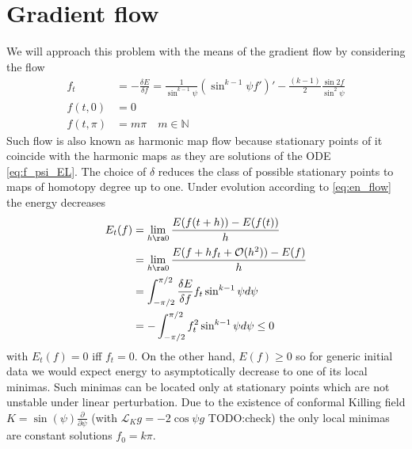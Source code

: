 \section{Gradient flow}
\label{sec:gradient-flow}


We will approach this problem with the means of the gradient
flow by considering the flow
\begin{equation}
  \label{eq:en_flow}
  \begin{split}
    f_t&=-\frac{\delta E}{\delta f}=\frac{1}{\sin^{k-1}\psi}\left(\sin^{k-1}\psi
      f'\right)'-\frac{(k-1)}{2}\frac{\sin2f}{\sin^2\psi}\\
    f\left(t,0\right)&=0\\
    f\left(t,\pi\right)&=m\pi\quad m\in\mathbb{N}
  \end{split}
\end{equation}
Such flow is also known as harmonic map flow because stationary points
of it coincide with the harmonic maps as they are solutions of the ODE
\eqref{eq:f_psi_EL}. The choice of $\delta$ reduces the class of
possible stationary points to maps of homotopy degree up to one. Under
evolution according to \eqref{eq:en_flow} the energy decreases
\begin{align}
  \label{eq:en_t}
  E_t(f)&=\lim_{h\ra0}\frac{E(f(t+h))-E(f(t))}{h}\\
  &=\lim_{h\ra0}\frac{E(f+h f_t+\mathcal{O}(h^2))-E(f)}{h}\\
  &=\int_{-\pi/2}^{\pi/2}\frac{\delta E}{\delta f}f_t\sin^{k-1}\psi d\psi\\
  &=-\int_{-\pi/2}^{\pi/2}f_t^2\sin^{k-1}\psi d\psi\le0
\end{align}
with $E_t(f)=0$ iff $f_t=0$. On the other hand, $E(f)\ge0$ so for
generic initial data we would expect energy to asymptotically decrease
to one of its local minimas. Such minimas can be located only at
stationary points which are not unstable under linear
perturbation. Due to the existence of conformal Killing field
$K=\sin(\psi)\frac{\partial}{\partial \psi}$ (with $\mathcal{L}_K
g=-2\cos\psi g$ TODO:check) the only local minimas are constant
solutions $f_0=k\pi$.

